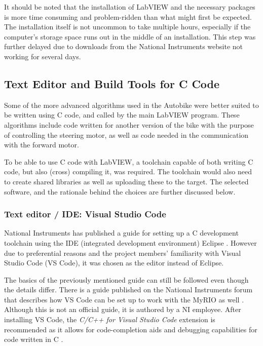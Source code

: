 It should be noted that the installation of LabVIEW and the necessary packages is more time consuming and problem-ridden than what might first be expected. The installation itself is not uncommon to take multiple hours, especially if the computer's storage space runs out in the middle of an installation. This step was further delayed due to downloads from the National Instruments website not working for several days.

\subsection{Text Editor and Build Tools for C Code}

Some of the more advanced algorithms used in the Autobike were better suited to be written using C code, and called by the main LabVIEW program. These algorithms include code written for another version of the bike with the purpose of controlling the steering motor, as well as code needed in the communication with the forward motor.

To be able to use C code with LabVIEW, a toolchain capable of both writing C code, but also (cross) compiling it, was required. The toolchain would also need to create shared libraries as well as uploading these to the target. The selected software, and the rationale behind the choices are further discussed below.

\subsubsection{Text editor / IDE: Visual Studio Code}

National Instruments has published a guide for setting up a C development toolchain using the IDE (integrated development environment) Eclipse \cite{NationalInstruments2021GettingEdition}. However due to preferential reasons and the project members' familiarity with Visual Studio Code (VS Code), it was chosen as the editor instead of Eclipse. 

The basics of the previously mentioned guide can still be followed even though the details differ. There is a guide published on the National Instruments forum that describes how VS Code can be set up to work with the MyRIO as well \cite{J2020NICode}. Although this is not an official guide, it is authored by a NI employee. After installing VS Code, the \textit{C/C++ for Visual Studio Code} extension is recommended as it allows for code-completion aids and debugging capabilities for code written in C \cite{VanLiew2022C++Code}. 

